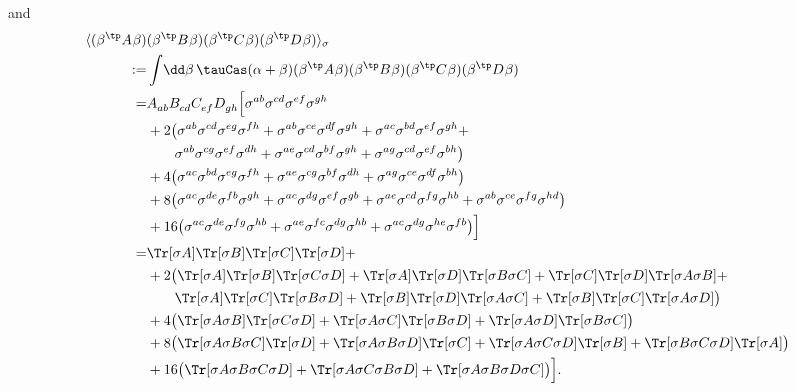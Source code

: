 \documentclass{article}
\numberwithin{equation}{section}
\begin{document}
and
\begin{align}\begin{split}\label{eq:gaussian-int-cl-8}
		\langle (\beta^\tp A^{} \beta)&(\beta^\tp B^{} \beta)(\beta^\tp C^{} \beta)(\beta^\tp D^{} \beta)\rangle_\sigma \\
		:=& \int \!\dd \beta\, \tauCas(\alpha+\beta) (\beta^\tp A^{} \beta)(\beta^\tp B^{} \beta)(\beta^\tp C^{} \beta)(\beta^\tp D^{} \beta)
		\\
		=& A^{}_{ab} B^{}_{cd} C^{}_{ef}  D^{}_{gh} \Big[\sigma^{ab}\sigma^{cd}\sigma^{ef} \sigma^{gh} \\
		&+2\big(
		\sigma^{ab}\sigma^{cd}\sigma^{eg} \sigma^{fh} +
		\sigma^{ab}\sigma^{ce}\sigma^{df} \sigma^{gh} +	\sigma^{ac}\sigma^{bd}\sigma^{ef} \sigma^{gh} +\\
		&\qquad\sigma^{ab}\sigma^{cg}\sigma^{ef} \sigma^{dh} +
		\sigma^{ae}\sigma^{cd}\sigma^{bf} \sigma^{gh} +
		\sigma^{ag}\sigma^{cd}\sigma^{ef} \sigma^{bh}
		\big) \\
		&+4\big(
		\sigma^{ac}\sigma^{bd}\sigma^{eg} \sigma^{fh} +
		\sigma^{ae}\sigma^{cg}\sigma^{bf} \sigma^{dh} +
		\sigma^{ag}\sigma^{ce}\sigma^{df} \sigma^{bh}
		\big) \\
		&+8\big(
		\sigma^{ac}\sigma^{de}\sigma^{fb} \sigma^{gh} +
		\sigma^{ac}\sigma^{dg}\sigma^{ef} \sigma^{gb} +
		\sigma^{ae}\sigma^{cd}\sigma^{fg} \sigma^{hb} +
		\sigma^{ab}\sigma^{ce}\sigma^{fg} \sigma^{hd}
		\big)\\
		&+16\big(
		\sigma^{ac}\sigma^{de}\sigma^{fg} \sigma^{hb} +
		\sigma^{ae}\sigma^{fc}\sigma^{dg} \sigma^{hb} +
		\sigma^{ac}\sigma^{dg}\sigma^{he} \sigma^{fb}
		\big)\Big]\\
		=& \Tr[\sigma A] \Tr[\sigma B] \Tr[\sigma C]  \Tr[\sigma D]  +\\
		&+2\big(
		\Tr[\sigma A] \Tr[\sigma B] \Tr[\sigma C \sigma D] +
		\Tr[\sigma A] \Tr[\sigma D] \Tr[\sigma B \sigma C] +
		\Tr[\sigma C] \Tr[\sigma D] \Tr[\sigma A \sigma B] +\\
		&\qquad \Tr[\sigma A] \Tr[\sigma C] \Tr[\sigma B \sigma D] +
		\Tr[\sigma B] \Tr[\sigma D] \Tr[\sigma A \sigma C] +
		\Tr[\sigma B] \Tr[\sigma C] \Tr[\sigma A \sigma D]
		\big) \\
		&+4\big(
		\Tr[\sigma A \sigma B]\Tr[\sigma C \sigma D]+
		\Tr[\sigma A \sigma C]\Tr[\sigma B \sigma D] +
		\Tr[\sigma A \sigma D] \Tr[\sigma B \sigma C]
		\big) \\
		&+8\big(
		\Tr[\sigma A \sigma B\sigma C]\Tr[\sigma D]+
		\Tr[\sigma A \sigma B\sigma D]\Tr[\sigma C]+
		\Tr[\sigma A \sigma C\sigma D]\Tr[\sigma B]+
		\Tr[\sigma B \sigma C\sigma D]\Tr[\sigma A]
		\big)\\
		&+16\big(
		\Tr[\sigma A \sigma B\sigma C \sigma D] +
		\Tr[\sigma A \sigma C\sigma B \sigma D] +
		\Tr[\sigma A \sigma B\sigma D \sigma C]
		\big)\Big].
\end{split}\end{align}




\end{document}
